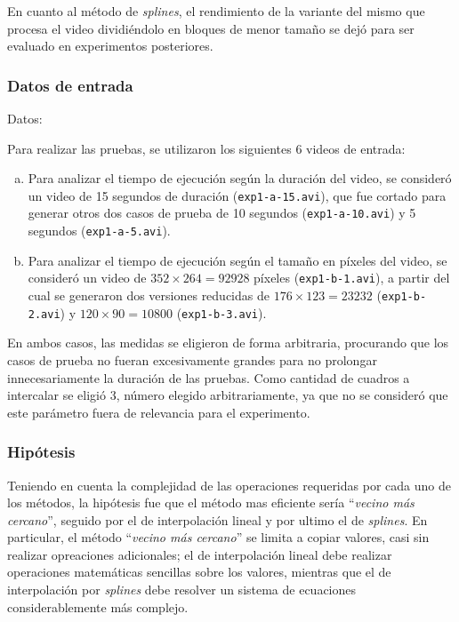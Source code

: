             En cuanto al método de \emph{splines}, el rendimiento de la variante del mismo que procesa el video dividiéndolo en bloques de menor tamaño se dejó para ser evaluado en experimentos posteriores.

        \subsubsection*{Datos de entrada}

        Datos:

            Para realizar las pruebas, se utilizaron los siguientes 6 videos de entrada:

            \begin{enumerate}[(a)]
                \item Para analizar el tiempo de ejecución según la duración del video, se consideró un video de 15 segundos de duración (\texttt{exp1-a-15.avi}), que fue cortado para generar otros dos casos de prueba de 10 segundos (\texttt{exp1-a-10.avi}) y 5 segundos (\texttt{exp1-a-5.avi}).
                \item Para analizar el tiempo de ejecución según el tamaño en píxeles del video, se consideró un video de $352 \times 264 = 92928$ píxeles (\texttt{exp1-b-1.avi}), a partir del cual se generaron dos versiones reducidas de $176 \times 123 = 23232$ (\texttt{exp1-b-2.avi}) y $ 120 \times 90 = 10800$ (\texttt{exp1-b-3.avi}).
            \end{enumerate}

            En ambos casos, las medidas se eligieron de forma arbitraria, procurando que los casos de prueba no fueran excesivamente grandes para no prolongar innecesariamente la duración de las pruebas. Como cantidad de cuadros a intercalar se eligió 3, número elegido arbitrariamente, ya que no se consideró que este parámetro fuera de relevancia para el experimento.

        \subsubsection*{Hipótesis}

            Teniendo en cuenta la complejidad de las operaciones requeridas por cada uno de los métodos, la hipótesis fue que el método mas eficiente sería ``\emph{vecino más cercano}'', seguido por el de interpolación lineal y por ultimo el de \emph{splines}. En particular, el método ``\emph{vecino más cercano}'' se limita a copiar valores, casi sin realizar opreaciones adicionales; el de interpolación lineal debe realizar operaciones matemáticas sencillas sobre los valores, mientras que el de interpolación por \emph{splines} debe resolver un sistema de ecuaciones considerablemente más complejo.

